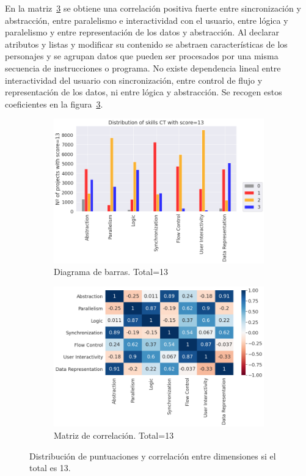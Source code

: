 \documentclass[a4paper, 12pt]{book}
\begin{document}
En la matriz~\ref{fig:corr13} se obtiene una correlación positiva fuerte entre sincronización y abstracción, entre paralelismo e interactividad con el usuario, entre lógica y paralelismo 
y entre representación de los datos y abstracción. Al declarar atributos y listas y modificar su contenido se abstraen características de los personajes y se agrupan datos que pueden ser procesados por una misma secuencia de instrucciones o programa. No existe dependencia lineal entre interactividad del usuario con sincronización, entre control de flujo y representación de los datos, ni entre lógica y abstracción. Se recogen estos coeficientes en la figura~\ref{fig:corr13}. 

\begin{figure}[H]
    \centering
    \begin{subfigure}[h]{.49\textwidth} 
        \includegraphics[width=\textwidth]{img/distribucion_13_Scratch}
        \caption{Diagrama de barras. Total=13}
        \label{fig:total13}
    \end{subfigure}       
    \begin{subfigure}[h]{.49\textwidth} 
        \includegraphics[width=\textwidth]{img/corr_13_Scratch}
        \caption{Matriz de correlación. Total=13}
        \label{fig:corr13}
    \end{subfigure}
     \caption{Distribución de puntuaciones y correlación entre dimensiones si el total es 13.}
\end{figure}
\end{document}

